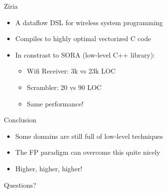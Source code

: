 \documentclass{beamer}
\begin{document}
  \begin{frame}{Ziria}
    \begin{itemize}
    \item A dataflow DSL for wireless system programming
    \item Compiles to highly optimal vectorized C code
    \item In constrast to SORA (low-level C++ library):
      \begin{itemize}
      \item Wifi Receiver: 3k vs 23k LOC
      \item Scrambler: 20 vs 90 LOC
      \item Same performance!
      \end{itemize}
    \end{itemize}
  \end{frame}
  
  \begin{frame}{Conclusion}
    \begin{itemize}
    \item Some domains are still full of low-level techniques
    \item The FP paradigm can overcome this quite nicely
    \item Higher, higher, higher!
    \end{itemize}
  \end{frame}
  
  \begin{frame}[standout]
    Questions?
  \end{frame}
  
  	
\end{document}
